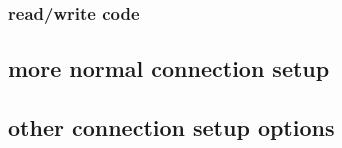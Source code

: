 \subsubsection{read/write code}



\subsection{more normal connection setup}



\subsection{other connection setup options}




